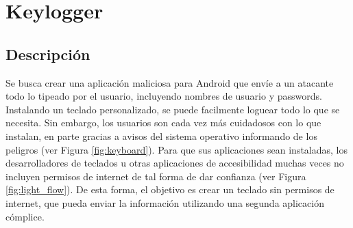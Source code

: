 \section{Keylogger}

	\subsection{Descripción}

	Se busca crear una aplicación maliciosa para Android que envíe a un atacante todo lo tipeado por el usuario, incluyendo nombres de usuario y passwords. Instalando un teclado personalizado, se puede facilmente loguear todo lo que se necesita. Sin embargo, los usuarios son cada vez más cuidadosos con lo que instalan, en parte gracias a avisos del sistema operativo informando de los peligros (ver Figura \ref{fig:keyboard}). Para que sus aplicaciones sean instaladas, los desarrolladores de teclados u otras aplicaciones de accesibilidad muchas veces no incluyen permisos de internet de tal forma de dar confianza (ver Figura \ref{fig:light_flow}).
	De esta forma, el objetivo es crear un teclado sin permisos de internet, que pueda enviar la información utilizando una segunda aplicación cómplice.
	
